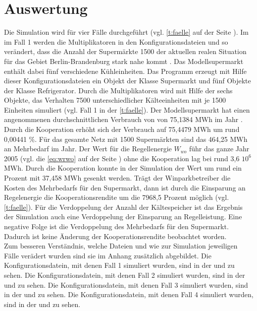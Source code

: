 \section{Auswertung}
Die Simulation wird f\"ur vier F\"alle durchgef\"uhrt (vgl. \cref{t:faelle} auf
der Seite \pageref{t:faelle}). Im im Fall 1 werden die Multiplikatoren in den
Konfigurationsdateien  und  so ver\"andert, dass
die Anzahl der Superm\"arkte 1500 der aktuellen realen Situation f\"ur das
Gebiet Berlin-Brandenburg stark nahe kommt \cite{caro}. Das Modellsupermarkt
enth\"alt dabei f\"unf verschiedene K\"uhleinheiten. Das Programm erzeugt mit
Hilfe dieser Konfigurationsdateien ein Objekt der Klasse Supermarkt und f\"unf
Objekte der Klasse Refrigerator. Durch die Multiplikatoren wird mit Hilfe der
sechs Objekte, das Verhalten 7500 unterschiedlicher K\"alteeinheiten mit je 1500
Einheiten simuliert (vgl. Fall 1 in der \cref{t:faelle}). Der Modellsupermarkt
hat einen angenommenen durchschnittlichen Verbrauch von von 75,1384 MWh im Jahr
\cite{caro}. Durch die Kooperation erh\"oht sich der Verbrauch auf 75,4479 MWh
um rund 0,00441 $\%$.  F\"ur das gesamte Netz mit 1500 Superm\"arkten sind das
464,25 MWh an Mehrbedarf im Jahr. Der Wert f\"ur die Regellenergie $W_{wo}$
f\"uhr das ganze Jahr 2005 (vgl. die \cref{eq:wrwo} auf der Seite
\pageref{eq:wrwo}) ohne die Kooperation lag bei rund 3,6 $10^6$ MWh. Durch die
Kooperation konnte in der Simulation der Wert um rund ein Prozent mit 37,458 MWh
gesenkt werden. Tr\"agt der Winparkbetreiber die Kosten des Mehrbedarfs
f\"ur den Supermarkt, dann ist durch die Einsparung an Regelenergie die
Kooperationsrendite um die 7968,5 Prozent m\"oglich (vgl. \cref{t:faelle}).
F\"ur die Verdoppelung der Anzahl der K\"altespeicher ist das Ergebnis der
Simulation auch eine Verdoppelung der Einsparung an Regelleistung. Eine negative
Folge ist die Verdoppelung des Mehrbedarfs f\"ur den Supermarkt. Dadurch ist
keine \"Anderung der Kooperationsrendite beobachtet worden.\\

Zum besseren Verst\"andnis, welche Dateien und wie zur Simulation jeweiligen
F\"alle ver\"adert wurden sind sie im Anhang zus\"atzlich abgebildet.
Die Konfigurationsdatein, mit denen Fall 1 simuliert wurden, sind in der
 und  zu sehen.
Die Konfigurationsdatein, mit denen Fall 2 simuliert wurden, sind in der
 und  zu sehen.
Die Konfigurationsdatein, mit denen Fall 3 simuliert wurden, sind in der
 und  zu sehen.
Die Konfigurationsdatein, mit denen Fall 4 simuliert wurden, sind in der
 und  zu sehen.


